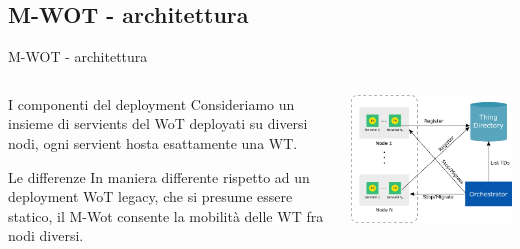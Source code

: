 \documentclass{beamer}
\begin{document}
\subsection{M-WOT - architettura}
\begin{frame}{M-WOT - architettura}
	\begin{columns}
		\begin{column}[c]{0.5\textwidth}
			\begin{block}{I componenti del deployment}
				 Consideriamo un insieme di servients del WoT deployati su diversi nodi, ogni servient hosta esattamente una WT.
			\end{block}
		\begin{block}{Le differenze}
			In maniera differente rispetto ad un deployment WoT legacy, che si presume essere statico, il M-Wot consente la mobilità delle WT fra nodi diversi.
		\end{block}
		\end{column}
		\begin{column}[c]{0.45\textwidth}
			\centering
			\includegraphics[width=\textwidth]{./images/7.png}
		\end{column}
	\end{columns}
\end{frame}
\end{document}
